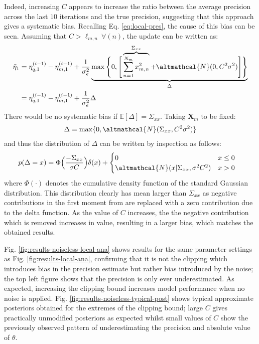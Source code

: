  Indeed, increasing $C$ appears to increase the ratio between the average precision across the last $10$ iterations and the true precision, suggesting that this approach gives a systematic bias. Recalling Eq. \ref{eq:local-pres}, the cause of this bias can be seen. Assuming that $C> \ell_{m, n}\ \forall(n)$, the update can be written as:
 \begin{align}
 \tilde{\eta}_1 &= \eta_{q, 1}^{(i-1)} - \eta_{m, 1}^{(i-1)} + \frac{1}{\sigma_e^2} \underbrace{\max \Bigg \lbrace 0, \Bigg[ \overbrace{\sum_{n=1}^{N_m} {x_{m,n}^2}}^{\Sigma_{xx}} + \altmathcal{N}(0, C^2 \sigma^2) \Bigg] \Bigg \rbrace}_{\Delta} \nonumber \\ 
 &=  \eta_{q, 1}^{(i-1)} - \eta_{m, 1}^{(i-1)} +  \frac{1}{\sigma_e^2} \Delta 
 \end{align}
 There would be no systematic bias if $\mathbb{E}[\Delta] = \Sigma_{xx}$. Taking $\bm{X}_m$ to be fixed:
 \begin{align}
 \Delta = \max \lbrace 0, \altmathcal{N}(\Sigma_{xx}, C^2 \sigma^2)\rbrace
 \end{align}
 and thus the distribution of $\Delta$ can be written by inspection as follows:
 \begin{align}
 p(\Delta = x) &=  \Phi \Big(\frac{-\Sigma_{xx}}{\sigma C}\Big) \delta(x) + \begin{cases}
 0 \hspace{0.5cm} & x \leq 0 \\
 \altmathcal{N}(x| \Sigma_{xx}, \sigma^2 C^2) & x >0
 \end{cases}
 \end{align}
 where $\Phi(\cdot)$ denotes the cumulative density function of the standard Gaussian distribution. This distribution clearly has mean larger than $\Sigma_{xx}$ as negative contributions in the first moment from are replaced with a zero contribution due to the delta function. As the value of $C$ increases, the the negative contribution which is removed increases in value, resulting in a larger bias, which matches the obtained results. 
 
 Fig. \ref{fig:results-noiseless-local-ana} shows results for the same parameter settings as Fig. \ref{fig:results-local-ana}, confirming that it is not the clipping which introduces bias in the precision estimate but rather bias introduced by the noise; the top left figure shows that the precision is only ever underestimated. As expected, increasing the clipping bound increases model performance when no noise is applied. Fig. \ref{fig:results-noiseless-typical-post} shows typical approximate posteriors obtained for the extremes of the clipping bound; large $C$ gives practically unmodified posteriors as expected whilst small values of $C$ show the previously observed pattern of underestimating the precision and absolute value of $\theta$.


